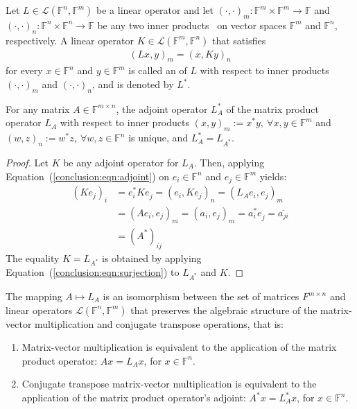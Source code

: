 \begin{definition}
Let $L \in \mathcal{L}(\mathbb{F}^n, \mathbb{F}^m)$ be a linear operator and
let $(\cdot, \cdot)_m : \mathbb{F}^m \times \mathbb{F}^m \rightarrow
\mathbb{F}$ and $(\cdot, \cdot)_n : \mathbb{F}^n \times \mathbb{F}^n
\rightarrow \mathbb{F}$ be any two inner products~\cite{la} on vector spaces
$\mathbb{F}^m$ and $\mathbb{F}^n$, respectively. A linear operator $K \in
\mathcal{L}(\mathbb{F}^m, \mathbb{F}^n)$ that satisfies
\begin{align}
    (Lx, y)_m = (x, Ky)_n \label{conclusion:eqn:adjoint}
\end{align}
for every $x \in \mathbb{F}^n$ and $y \in \mathbb{F}^m$ is called an
 of $L$ with respect to inner products $(\cdot,
\cdot)_m$ and $(\cdot, \cdot)_n$, and is denoted by $L^*$.
\end{definition}

\begin{theorem}
\label{conclusion:thm:adjoint}
For any matrix $A \in \mathbb{F}^{m \times n}$, the adjoint operator $L_A^*$ of
the matrix product operator $L_A$ with respect to inner products $(x, y)_m :=
x^*y, \ \forall x,y \in \mathbb{F}^m$ and $(w, z)_n := w^*z, \ \forall w, z \in
\mathbb{F}^n$ is unique, and $L_A^* = L_{A^*}^{}$.
\end{theorem}

\begin{proof}
Let $K$ be any adjoint operator for $L_A$. Then, applying
Equation~(\ref{conclusion:eqn:adjoint}) on $e_i \in \mathbb{F}^n$ and $e_j \in
\mathbb{F}^m$ yields:
\begin{align}
    (Ke_j)_i &= e_i^*Ke_j^{} = (e_i, Ke_j)_n = (L_Ae_i, e_j)_m \nonumber \\
             &= (Ae_i,  e_j)_m = (a_i, e_j)_m =a_i^*e_j^{} = \overline{a_{ji}}
             \\
             &= (A^*)_{ij} \nonumber
\end{align}
The equality $K = L_{A^*}$ is obtained by applying
Equation~(\ref{conclusion:eqn:surjection}) to $L_{A^*}$ and $K$.
\end{proof}

\begin{corollary}
The mapping $A \mapsto L_A$ is an isomorphism between the set of
matrices $F^{m \times n}$ and linear operators $\mathcal{L}(\mathbb{F}^n,
\mathbb{F}^m)$ that preserves the algebraic structure of the matrix-vector
multiplication and conjugate transpose operations, that is:
\begin{enumerate}
\item Matrix-vector multiplication is equivalent to the application of the
matrix product operator: $Ax = L_Ax$, for $x \in \mathbb{F}^n$.
\item Conjugate transpose matrix-vector multiplication is equivalent to the
application of the matrix product operator's adjoint: $A^*x = L_A^*x$, for $x
\in \mathbb{F}^n$.
\end{enumerate}
\end{corollary}

